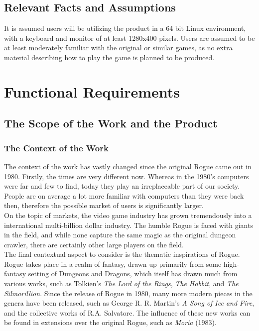\documentclass[12pt, titlepage]{article}
\begin{document}
	\subsection{Relevant Facts and Assumptions}

It is assumed users will be utilizing the product in a 64 bit Linux environment, with a keyboard and monitor of at least 1280x400 pixels. Users are assumed to be at least moderately familiar with the original or similar games, as no extra material describing how to play the game is planned to be produced.

\section{Functional Requirements}

	\subsection{The Scope of the Work and the Product}

		\subsubsection{The Context of the Work}

		The context of the work has vastly changed since the original Rogue came out in 1980. Firstly, the times are very different now. Whereas in the 1980's computers were far and few to find, today they play an irreplaceable part of our society. People are on average a lot more familiar with computers than they were back then, therefore the possible market of users is significantly larger.\\

		On the topic of markets, the video game industry has grown tremendously into a international multi-billion dollar industry. The humble Rogue is faced with giants in the field, and while none capture the same magic as the original dungeon crawler, there are certainly other large players on the field.\\

		The final contextual aspect to consider is the thematic inspirations of Rogue. Rogue takes place in a realm of fantasy, drawn up primarily from some high-fantasy setting of Dungeons and Dragons, which itself has drawn much from various works, such as Tolkien's \textit{The Lord of the Rings}, \textit{The Hobbit}, and \textit{The Silmarillion}. Since the release of Rogue in 1980, many more modern pieces in the genera have been released, such as George R. R. Martin's \textit{A Song of Ice and Fire}, and the collective works of R.A. Salvatore. The influence of these new works can be found in extensions over the original Rogue, such as \textit{Moria} (1983).
\end{document}
